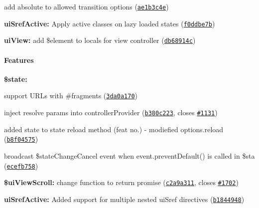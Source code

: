 {{{\begin{DoxyItemize}
$$\begin{DoxyItemize}
\item add absolute to allowed transition options (\href{https://github.com/angular-ui/ui-router/commit/ae1b3c4eedc37983400d830895afb50457c63af4}{\tt ae1b3c4e})
\end{DoxyItemize}
\item {\bfseries ui\+Sref\+Active\+:} Apply active classes on lazy loaded states (\href{https://github.com/angular-ui/ui-router/commit/f0ddbe7b4a91daf279c3b7d0cee732bb1f3be5b4}{\tt f0ddbe7b})
\item {\bfseries ui\+View\+:} add {\ttfamily \$element} to locals for view controller (\href{https://github.com/angular-ui/ui-router/commit/db68914cd6c821e7dec8155bd33142a3a97f5453}{\tt db68914c})
\end{DoxyItemize}}}}

{\bfseries {\bfseries {\bfseries \paragraph*{Features}}}}

{\bfseries {\bfseries {\bfseries }}}

{\bfseries {\bfseries {\bfseries 
\begin{DoxyItemize}
\item {\bfseries \$state\+:}
\begin{DoxyItemize}
\item support U\+R\+Ls with \#fragments (\href{https://github.com/angular-ui/ui-router/commit/3da0a17069e27598c0f9d9164e104dd5ce05cdc6}{\tt 3da0a170})
\item inject resolve params into controller\+Provider (\href{https://github.com/angular-ui/ui-router/commit/b380c223fe12e2fde7582c0d6b1ed7b15a23579b}{\tt b380c223}, closes \href{https://github.com/angular-ui/ui-router/issues/1131}{\tt \#1131})
\item added \textquotesingle{}state\textquotesingle{} to state reload method (feat no.) -\/ modiefied options.\+reload (\href{https://github.com/angular-ui/ui-router/commit/b8f04575a8557035c1858c4d5c8dbde3e1855aaa}{\tt b8f04575})
\item broadcast \$state\+Change\+Cancel event when event.\+prevent\+Default() is called in \$sta (\href{https://github.com/angular-ui/ui-router/commit/ecefb758cb445e41620b62a272aafa3638613d7a}{\tt ecefb758})
\end{DoxyItemize}
\item {\bfseries \$ui\+View\+Scroll\+:} change function to return promise (\href{https://github.com/angular-ui/ui-router/commit/c2a9a311388bb212e5a2e820536d1d739f829ccd}{\tt c2a9a311}, closes \href{https://github.com/angular-ui/ui-router/issues/1702}{\tt \#1702})
\item {\bfseries ui\+Sref\+Active\+:} Added support for multiple nested ui\+Sref directives (\href{https://github.com/angular-ui/ui-router/commit/b18449481d152b50705abfce2493a444eb059fa5}{\tt b1844948})
\end{DoxyItemize}}}}

